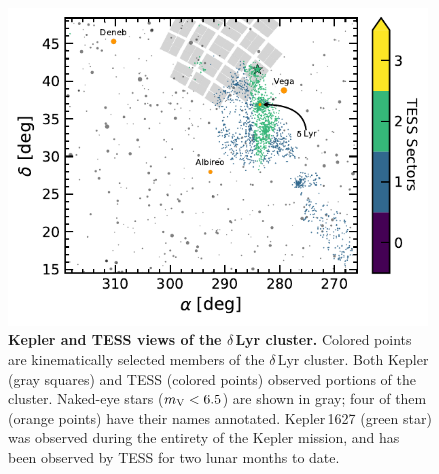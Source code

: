 \documentclass[12pt,modern,tighten]{aastex63}
\begin{document}
\begin{figure}[t]
	\begin{center}
		\leavevmode
		\includegraphics[width=0.99\textwidth]{f2.pdf}
	\end{center}
	\vspace{-0.7cm}
	\caption{
    {\bf Kepler and TESS views of the $\delta$\,Lyr cluster.} Colored
    points are kinematically selected members of the $\delta$\,Lyr
    cluster.  Both Kepler (gray squares) and TESS (colored points)
    observed portions of the cluster.  Naked-eye stars ($m_{\rm
    V}<6.5$) are shown in gray; four of them (orange points) have
    their names annotated.  Kepler\,1627 (green star) was observed
    during the entirety of the Kepler mission, and has been observed
    by TESS for two lunar months to date.
		\label{fig:skychart}
	}
\end{figure}
\end{document}
